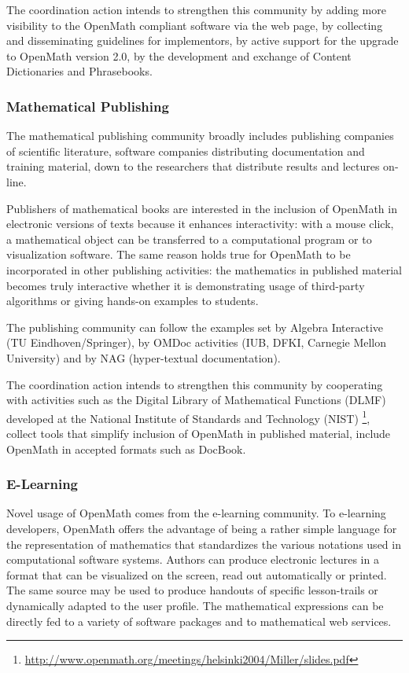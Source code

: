 \documentclass{euproposal}
\begin{document}
The coordination action intends to strengthen this community by adding
more visibility to the OpenMath compliant software via the web page,
by collecting and disseminating guidelines for implementors, by active
support for the upgrade to OpenMath version 2.0, by the development
and exchange of Content Dictionaries and Phrasebooks.

\subsubsection{Mathematical Publishing}\label{sec:mpubl}

The mathematical publishing community broadly includes publishing
companies of scientific literature, software companies distributing
documentation and training material, down to the researchers that
distribute results and lectures on-line.

Publishers of mathematical books are interested in the inclusion of
OpenMath in electronic versions of texts because it enhances
interactivity: with a mouse click, a mathematical object can be
transferred to a computational program or to visualization software.
The same reason holds true for OpenMath to be incorporated in other
publishing activities: the mathematics in published material becomes
truly interactive whether it is demonstrating usage of third-party
algorithms or giving hands-on examples to students.

The publishing community can follow the examples set by Algebra
Interactive (TU Eindhoven/Springer), by OMDoc activities (IUB, DFKI,
Carnegie Mellon University) and by NAG (hyper-textual documentation).

The coordination action intends to strengthen this community by
cooperating with activities such as the Digital Library of
Mathematical Functions (DLMF) developed at the National Institute of
Standards and Technology (NIST)
\footnote{\url{http://www.openmath.org/meetings/helsinki2004/Miller/slides.pdf}},
collect tools that simplify inclusion of OpenMath in published
material, include OpenMath in accepted formats such as DocBook.


\subsubsection{E-Learning}\label{sec:e-learn}
Novel usage of OpenMath comes from the e-learning community. To
e-learning developers, OpenMath offers the advantage of being a rather
simple language for the representation of mathematics that
standardizes the various notations used in computational software
systems. Authors can produce electronic lectures in a format that can
be visualized on the screen, read out automatically or printed. The
same source may be used to produce handouts of specific lesson-trails
or dynamically adapted to the user profile. The mathematical
expressions can be directly fed to a variety of software packages and
to mathematical web services.
\end{document}
